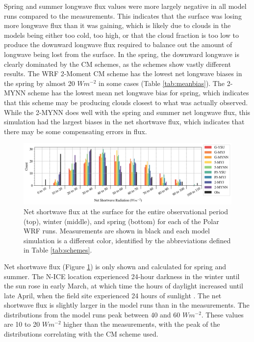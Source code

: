  Spring and summer longwave flux values were more largely negative in all model runs compared to the measurements. This indicates that the surface was losing more longwave flux than it was gaining, which is likely due to clouds in the models being either too cold, too high, or that the cloud fraction is too low to produce the downward longwave flux required to balance out the amount of longwave being lost from the surface. In the spring, the downward longwave is clearly dominated by the CM schemes, as the schemes show vastly different results. The WRF 2-Moment CM scheme has the lowest net longwave biases in the spring by almost 20 $Wm^{-2}$ in some cases (Table \ref{tab:meanbias}). The 2-MYNN scheme has the lowest mean net longwave bias for spring, which indicates that this scheme may be producing clouds closest to what was actually observed. While the 2-MYNN does well with the spring and summer net longwave flux, this simulation had the largest biases in the net shortwave flux, which indicates that there may be some compensating errors in flux.

\begin{figure}[h!]
    \centering
    \includegraphics[width=1\linewidth]{figures/chapter3/WRF_NetSW_Histo.png}
    \caption[Polar WRF simulated net shortwave flux histograms.]{Net shortwave flux at the surface for the entire observational period (top), winter (middle), and spring (bottom) for each of the Polar WRF runs. Measurements are shown in black and each model simulation is a different color, identified by the abbreviations defined in Table \ref{tab:schemes}.}
    \label{fig:wrf_netsw}
\end{figure}

Net shortwave flux (Figure \ref{fig:wrf_netsw}) is only shown and calculated for spring and summer. The N-ICE location experienced 24-hour darkness in the winter until the sun rose in early March, at which time the hours of daylight increased until late April, when the field site experienced 24 hours of sunlight \citep{walden:2017}. The net shortwave flux is slightly larger in the model runs than in the measurements. The distributions from the model runs peak between 40 and 60 $Wm^{-2}$. These values are 10 to 20 $Wm^{-2}$ higher than the measurements, with the peak of the distributions correlating with the CM scheme used. 


